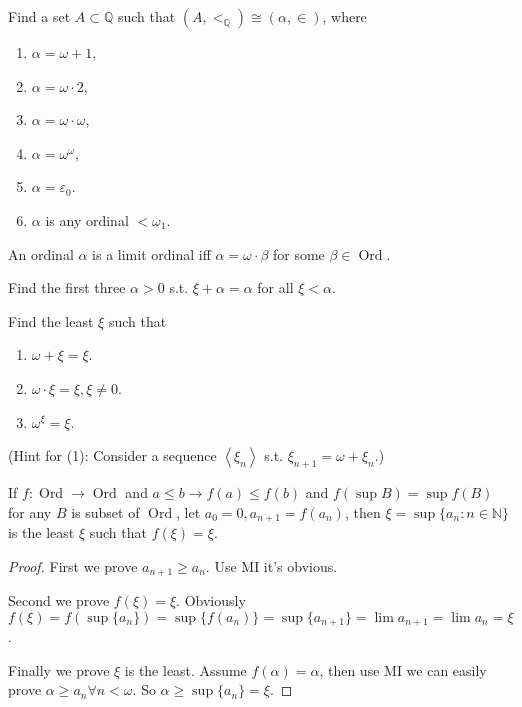 \documentclass{ctexart}
\DeclareMathOperator{\ord}{Ord}
\newcommand{\N}{\mathbb{N}}
\begin{document}
\begin{problem}
Find a set $A \subset \mathbb{Q}$ such that $\left(A,<_{\mathbb{Q}}\right) \cong(\alpha, \in)$, where
\begin{enumerate}[label=\alph*,ref=\theproblem.\alph*]
\item  $\alpha=\omega+1$,
\item  $\alpha=\omega \cdot 2$,
\item  $\alpha=\omega \cdot \omega$,
\item  $\alpha=\omega^\omega$,
\item  $\alpha=\varepsilon_0$.
\item  $\alpha$ is any ordinal $<\omega_1$.
\end{enumerate}
\end{problem}



\begin{problem}
An ordinal $\alpha$ is a limit ordinal iff $\alpha=\omega \cdot \beta$ for some $\beta \in\ord$.
\end{problem}



\begin{problem}
Find the first three $\alpha>0$ s.t. $\xi+\alpha=\alpha$ for all $\xi<\alpha$.
\end{problem}



\begin{problem}
Find the least $\xi$ such that
\begin{enumerate}[label=\alph*,ref=\theproblem.\alph*]
\item  $\omega+\xi=\xi$.
\item  $\omega \cdot \xi=\xi, \xi \neq 0$.
\item  $\omega^{\xi}=\xi$.
\end{enumerate}
(Hint for (1): Consider a sequence $\left\langle\xi_n\right\rangle$ s.t. $\xi_{n+1}=\omega+\xi_n$.)
\end{problem}
\begin{lemma}\label{lem:f}
If $f:\ord\to\ord$ and $a\leq b\to f(a)\leq f(b)$ and $f(\sup B)=\sup f(B)$ for any $B$ is subset of $\ord$, let $a_0=0,a_{n+1}=f(a_n)$, then $\xi=\sup\{a_n:n\in\N\}$ is the least $\xi$ such that $f(\xi)=\xi$. 
\end{lemma}
\begin{proof}
First we prove $a_{n+1}\geq a_n$. Use MI it's obvious. 

Second we prove $f(\xi)=\xi$. Obviously $f(\xi)=f(\sup\{a_n\})=\sup\{f(a_n)\}=\sup\{a_{n+1}\}=\lim a_{n+1}=\lim a_n=\xi$.

Finally we prove $\xi$ is the least. Assume $f(\alpha)=\alpha$, then use MI we can easily prove $\alpha\geq a_n\forall n<\omega$. So $\alpha\geq \sup\{a_n\}=\xi$. 
\end{proof}
\end{document}
